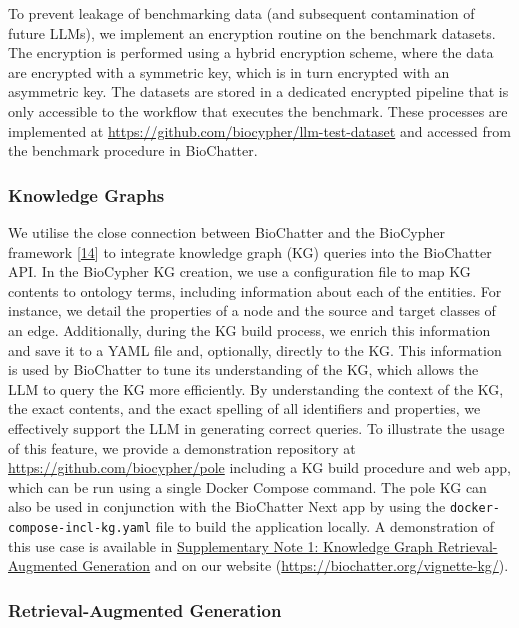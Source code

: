 To prevent leakage of benchmarking data (and subsequent contamination of future LLMs), we implement an encryption routine on the benchmark datasets.
The encryption is performed using a hybrid encryption scheme, where the data are encrypted with a symmetric key, which is in turn encrypted with an asymmetric key.
The datasets are stored in a dedicated encrypted pipeline that is only accessible to the workflow that executes the benchmark.
These processes are implemented at \url{https://github.com/biocypher/llm-test-dataset} and accessed from the benchmark procedure in BioChatter.

\hypertarget{knowledge-graphs-1}{%
\subsubsection{Knowledge Graphs}\label{knowledge-graphs-1}}

We utilise the close connection between BioChatter and the BioCypher framework {[}\protect\hyperlink{ref-tr1XjZ1R}{14}{]} to integrate knowledge graph (KG) queries into the BioChatter API.
In the BioCypher KG creation, we use a configuration file to map KG contents to ontology terms, including information about each of the entities.
For instance, we detail the properties of a node and the source and target classes of an edge.
Additionally, during the KG build process, we enrich this information and save it to a YAML file and, optionally, directly to the KG.
This information is used by BioChatter to tune its understanding of the KG, which allows the LLM to query the KG more efficiently.
By understanding the context of the KG, the exact contents, and the exact spelling of all identifiers and properties, we effectively support the LLM in generating correct queries.
To illustrate the usage of this feature, we provide a demonstration repository at \url{https://github.com/biocypher/pole} including a KG build procedure and web app, which can be run using a single Docker Compose command.
The pole KG can also be used in conjunction with the BioChatter Next app by using the \texttt{docker-compose-incl-kg.yaml} file to build the application locally.
A demonstration of this use case is available in \protect\hyperlink{supplementary-note-1-knowledge-graph-retrieval-augmented-generation}{Supplementary Note 1: Knowledge Graph Retrieval-Augmented Generation} and on our website (\url{https://biochatter.org/vignette-kg/}).

\hypertarget{retrieval-augmented-generation-1}{%
\subsubsection{Retrieval-Augmented Generation}\label{retrieval-augmented-generation-1}}

